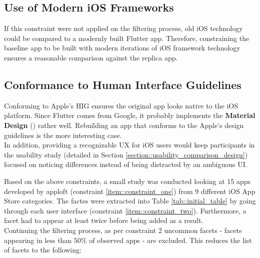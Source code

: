 \subsection*{Use of Modern iOS Frameworks}
If this constraint were not applied on the filtering process, old iOS technology could be compared to a modernly built Flutter app. 
Therefore, constraining the baseline app to be built with modern iterations of iOS framework technology ensures a reasonable comparison 
against the replica app.\\


\subsection*{Conformance to Human Interface Guidelines}
Conforming to Apple's HIG ensures the original app looks native to the iOS platform.
Since Flutter comes from Google, it probably implements the \textbf{Material Design} (\cite{Google2021}) rather well. Rebuilding an app that conforms to the Apple's design guidelines is the more interesting case.\\
In addition, providing a recognizable UX for iOS users would keep participants in the usability study (detailed in Section \ref{section::usability_comparison_design}) focused on noticing differences instead of 
being distracted by an ambiguous UI.\\
\hfill \break


Based on the above constraints, a small study was conducted looking at 15 apps developed by apploft (constraint \ref{item::constraint_one}) from 9 different iOS App Store categories. 
The factes were extracted into Table \ref{tab::initial_table} by going through each user interface (constraint \ref{item::constraint_two}).
Furthermore, a facet had to appear at least twice before being added as a result.\\
Continuing the filtering process, as per constraint 2 uncommon facets - facets appearing
in less than 50\% of observed apps - are excluded. This reduces the list of facets to the following:

